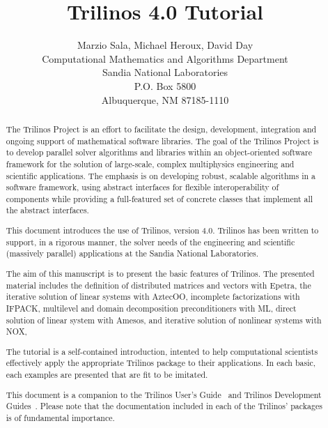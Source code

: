 \documentclass[12pt,relax]{SANDreport}
\author{Marzio Sala, Michael Heroux, David Day \\
Computational Mathematics and Algorithms Department \\
Sandia National Laboratories \\
P.O. Box 5800 \\
Albuquerque, NM 87185-1110
}
\title{Trilinos 4.0 Tutorial}
\newcommand{\Trilinos}{Trilinos}
\begin{document}
\maketitle

\begin{abstract}
  
  The Trilinos Project is an effort to facilitate the design,
  development, integration and ongoing support of mathematical software
  libraries.  The goal of the Trilinos Project is to develop parallel
  solver algorithms and libraries within an object-oriented software
  framework for the solution of large-scale, complex multiphysics
  engineering and scientific applications. The emphasis is on developing
  robust, scalable algorithms in a software framework, using abstract
  interfaces for flexible interoperability of components while providing
  a full-featured set of concrete classes that implement all the
  abstract interfaces.

  \medskip
  
  This document introduces the use of \Trilinos{}, version 4.0.
  \Trilinos{} has been written to support, in a rigorous manner, the
  solver needs of the engineering and scientific (massively parallel)
  applications at the Sandia National Laboratories.

  \medskip
  
  The aim of this manuscript is to present the basic features of
  Trilinos. The presented material includes the definition of
  distributed matrices and vectors with Epetra, the iterative solution
  of linear systems with AztecOO, incomplete factorizations with IFPACK,
  multilevel and domain decomposition preconditioners with ML, direct
  solution of linear system with Amesos, 
  and iterative solution of nonlinear systems
  with NOX, 
  
  The tutorial is a self-contained introduction, intented to help
  computational scientists effectively apply the appropriate Trilinos
  package to their applications. In each basic, each examples are
  presented that are fit to be imitated.

  \medskip
  
  This document is a companion to the Trilinos User's
  Guide~\cite{Trilinos-Users-Guide} and Trilinos Development
  Guides~\cite{Trilinos-Dev-Guide,Trilinos-Dev-Guide-II}. Please note
  that the documentation included in each of the Trilinos' packages is
  of fundamental importance.
 
\end{abstract}
\end{document}
